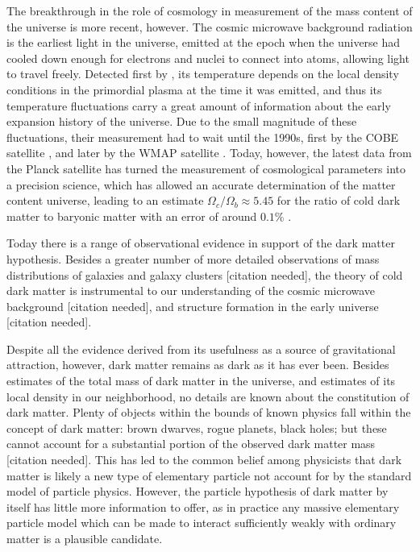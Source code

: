 \documentclass[b5paper, 10pt, twoside]{book}
\newcommand{\typographersred}{scp-red-dark-3}
\newcommand{\needcite}{\textcolor{\typographersred}{[citation needed]}}
\begin{document}
The breakthrough in the role of cosmology in measurement of the mass content of the universe is more recent, however. The cosmic microwave background radiation is the earliest light in the universe, emitted at the epoch when the universe had cooled down enough for electrons and nuclei to connect into atoms, allowing light to travel freely. Detected first by \textcite{PenziasWilson1965}, its temperature depends on the local density conditions in the primordial plasma at the time it was emitted, and thus its temperature fluctuations carry a great amount of information about the early expansion history of the universe. Due to the small magnitude of these fluctuations, their measurement had to wait until the 1990s, first by the COBE satellite \parencite{BennettEtAl1996}, and later by the WMAP satellite \parencite{BennettEtAl2013}. Today, however, the latest data from the Planck satellite has turned the measurement of cosmological parameters into a precision science, which has allowed an accurate determination of the matter content universe, leading to an estimate $\Omega_c/\Omega_b\approx 5.45$ for the ratio of cold dark matter to baryonic matter with an error of around $0.1\%$ \parencite{Planck2018}.



Today there is a range of observational evidence in support of the dark matter hypothesis. Besides a greater number of more detailed observations of mass distributions of galaxies and galaxy clusters \needcite, the theory of cold dark matter is instrumental to our understanding of the cosmic microwave background \needcite, and structure formation in the early universe \needcite.

Despite all the evidence derived from its usefulness as a source of gravitational attraction, however, dark matter remains as dark as it has ever been. Besides estimates of the total mass of dark matter in the universe, and estimates of its local density in our neighborhood, no details are known about the constitution of dark matter. Plenty of objects within the bounds of known physics fall within the concept of dark matter: brown dwarves, rogue planets, black holes; but these cannot account for a substantial portion of the observed dark matter mass \needcite. This has led to the common belief among physicists that dark matter is likely a new type of elementary particle not account for by the standard model of particle physics. However, the particle hypothesis of dark matter by itself has little more information to offer, as in practice any massive elementary particle model which can be made to interact sufficiently weakly with ordinary matter is a plausible candidate.
\end{document}
